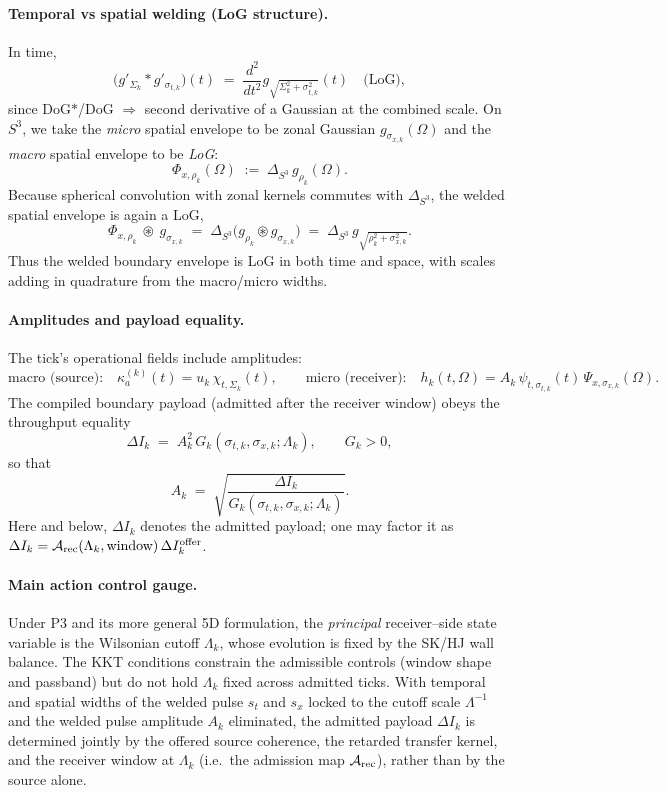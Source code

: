 \documentclass[10pt]{article}
\theoremstyle{definition}
\theoremstyle{plain}
\begin{document}
\paragraph{Temporal vs spatial welding (LoG structure).}\label{par:uom-main-010}
In time,
\[
\big(g'_{\Sigma_k}*g'_{\sigma_{t,k}}\big)(t)\;=\;\frac{d^2}{dt^2}g_{\sqrt{\Sigma_k^2+\sigma_{t,k}^2}}(t)\quad\text{(LoG)}, 
\]
since DoG${*}$/DoG $\Rightarrow$ second derivative of a Gaussian at the combined scale.
On $S^3$, we take the \emph{micro} spatial envelope to be zonal Gaussian $g_{\sigma_{x,k}}(\Omega)$ and the \emph{macro} spatial envelope to be \emph{LoG}:
\[
\Phi_{x,\rho_k}(\Omega)\;:=\;\Delta_{S^3}\,g_{\rho_k}(\Omega).
\]
Because spherical convolution with zonal kernels commutes with $\Delta_{S^3}$, the welded spatial envelope is again a LoG,
\[
\Phi_{x,\rho_k}\ \circledast\ g_{\sigma_{x,k}}
\;=\;\Delta_{S^3}\!\big(g_{\rho_k}\circledast g_{\sigma_{x,k}}\big)
\;=\;\Delta_{S^3}\,g_{\sqrt{\rho_k^2+\sigma_{x,k}^2}}.
\]
Thus the welded boundary envelope is LoG in both time and space, with scales adding in quadrature from the macro/micro widths.


\paragraph{Amplitudes and payload equality.}\label{par:uom-main-011}
The tick’s operational fields include amplitudes:
\[
\text{macro (source):}\quad \kappa_a^{(k)}(t)=u_k\,\chi_{t,\Sigma_k}(t),\qquad
\text{micro (receiver):}\quad h_k(t,\Omega)=A_k\,\psi_{t,\sigma_{t,k}}(t)\,\Psi_{x,\sigma_{x,k}}(\Omega).
\]
The compiled boundary payload (admitted after the receiver window) obeys the throughput equality
\[
\Delta I_k \;=\; A_k^2\,G_k(\sigma_{t,k},\sigma_{x,k};\Lambda_k),\qquad G_k>0,
\]
so that
\[
A_k \;=\; \sqrt{\frac{\Delta I_k}{G_k(\sigma_{t,k},\sigma_{x,k};\Lambda_k)}}.
\]
Here and below, $\Delta I_k$ denotes the admitted payload; one may factor it as
$\Delta I_k=\mathcal A_{\rm rec}(\Lambda_k,\text{window})\,\Delta I_k^{\rm offer}$.
\paragraph{Main action control gauge.}\label{par:uom-main-012}
Under P3 and its more general 5D formulation, the \emph{principal} receiver--side state variable is the
Wilsonian cutoff $\Lambda_k$, whose evolution is fixed by the SK/HJ wall balance. The KKT conditions constrain
the admissible controls (window shape and passband) but do not hold $\Lambda_k$ fixed across admitted ticks.
With temporal and spatial widths of the welded pulse $s_t$ and $s_x$ locked to the cutoff scale $\Lambda^{-1}$
and the welded pulse amplitude $A_k$ eliminated, the admitted payload $\Delta I_k$ is determined jointly by the
offered source coherence, the retarded transfer kernel, and the receiver window at $\Lambda_k$ (i.e.\ the
admission map $\mathcal A_{\rm rec}$), rather than by the source alone.
\end{document}
